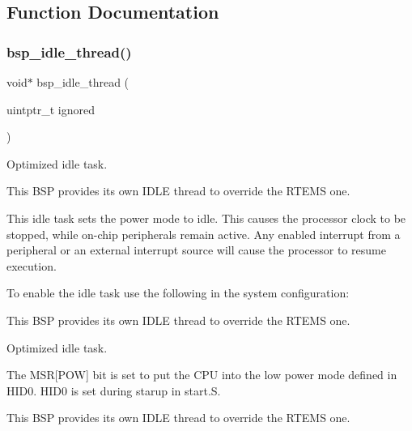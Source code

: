 \subsection{Function Documentation}
\mbox{\label{group__RTEMSBSPsSPARCLEON3_ga301be7085b80c41a9c5887247003c662}} 
\subsubsection{\texorpdfstring{bsp\_idle\_thread()}{bsp\_idle\_thread()}}
{\footnotesize\ttfamily void$\ast$ bsp\+\_\+idle\+\_\+thread (\begin{DoxyParamCaption}\item[{uintptr\+\_\+t}]{ignored }\end{DoxyParamCaption})}



Optimized idle task. 

This B\+SP provides its own I\+D\+LE thread to override the R\+T\+E\+MS one.

This idle task sets the power mode to idle. This causes the processor clock to be stopped, while on-\/chip peripherals remain active. Any enabled interrupt from a peripheral or an external interrupt source will cause the processor to resume execution.

To enable the idle task use the following in the system configuration\+:


\begin{DoxyCode}{0}
\DoxyCodeLine{\textcolor{preprocessor}{\#include <bsp.h>}}
\DoxyCodeLine{}
\DoxyCodeLine{\textcolor{preprocessor}{\#define CONFIGURE\_INIT}}
\DoxyCodeLine{}
\DoxyCodeLine{\textcolor{preprocessor}{\#define CONFIGURE\_IDLE\_TASK\_BODY bsp\_idle\_thread}}
\DoxyCodeLine{}
\end{DoxyCode}


This B\+SP provides its own I\+D\+LE thread to override the R\+T\+E\+MS one.

Optimized idle task.

The M\+SR\mbox{[}P\+OW\mbox{]} bit is set to put the C\+PU into the low power mode defined in H\+I\+D0. H\+I\+D0 is set during starup in start.\+S.

This B\+SP provides its own I\+D\+LE thread to override the R\+T\+E\+MS one.

